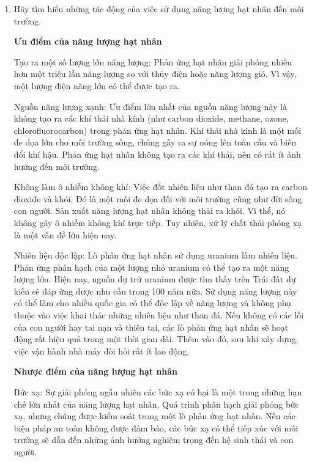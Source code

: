 
\setcounter{section}{0}

\begin{enumerate}[label=\bfseries Câu \arabic*:]
	\item {}
	
	
	{
		Hãy tìm hiểu những tác động của việc sử dụng năng lượng hạt nhân đến môi trường.
	}
	
	\hideall
	{
		\textbf{Ưu điểm của năng lượng hạt nhân}
		
		Tạo ra một số lượng lớn năng lượng: Phản ứng hạt nhân giải phóng nhiều hơn một triệu lần năng lượng so với thủy điện hoặc năng lượng gió. Vì vậy, một lượng điện năng lớn có thể được tạo ra. 
		
		Nguồn năng lượng xanh: Ưu điểm lớn nhất của nguồn năng lượng này là không tạo ra các khí thải nhà kính (như carbon dioxide, methane, ozone, chlorofluorocarbon) trong phản ứng hạt nhân. Khí thải nhà kính là một mối đe dọa lớn cho môi trường sống, chúng gây ra sự nóng lên toàn cầu và biến đổi khí hậu. Phản ứng hạt nhân không tạo ra các khí thải, nên có rất ít ảnh hưởng đến môi trường.
		
		Không làm ô nhiễm không khí: Việc đốt nhiên liệu như than đá tạo ra carbon dioxide và khói. Đó là một mối đe dọa đối với môi trường cũng như đời sống con người. Sản xuất năng lượng hạt nhân không thải ra khói. Vì thế, nó không gây  ô nhiễm không khí trực tiếp. Tuy nhiên, xử lý chất thải phóng xạ là một vấn đề lớn hiện nay.
		
		Nhiên liệu độc lập: Lò phản ứng hạt nhân sử dụng uranium làm nhiên liệu. Phản ứng phân hạch của một lượng nhỏ uranium có thể tạo ra một năng lượng lớn. Hiện nay, nguồn dự trữ uranium được tìm thấy trên Trái đất dự kiến sẽ đáp ứng được nhu cầu trong 100 năm nữa. Sử dụng năng lượng này có thể làm cho nhiều quốc gia có thể độc lập về năng lượng và không phụ thuộc vào việc khai thác những nhiên liệu như than đá. Nếu không có các lỗi của con người hay tai nạn và thiên tai, các lò phản ứng hạt nhân sẽ hoạt động rất hiệu quả trong một thời gian dài. Thêm vào đó, sau khi xây dựng, việc vận hành nhà máy đòi hỏi rất ít lao động.
		
		\textbf{Nhược điểm của năng lượng hạt nhân}
		
		Bức xạ: Sự giải phóng ngẫu nhiên các bức xạ có hại là một trong những hạn chế lớn nhất của năng lượng hạt nhân. Quá trình phân hạch giải phóng bức xạ, nhưng chúng được kiểm soát trong một lò phản ứng hạt nhân. Nếu các biện pháp an toàn không được đảm bảo, các bức xạ có thể tiếp xúc với môi trường sẽ dẫn đến những ảnh hưởng nghiêm trọng đến hệ sinh thái và con người.
		
}
\end{enumerate}
